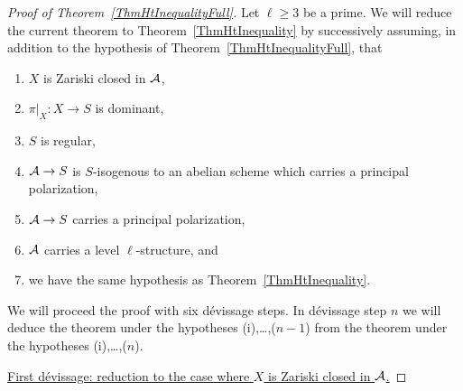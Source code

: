\begin{proof}[Proof of Theorem~\ref{ThmHtInequalityFull}]
  Let $\ell\ge 3$ be a prime.
  We will  reduce the current theorem to Theorem~\ref{ThmHtInequality}
  by successively assuming, in addition to the hypothesis of Theorem~\ref{ThmHtInequalityFull}, that
\begin{enumerate}
  \item[(i)] $X$ is Zariski closed in $\mathcal{A}$,
  \item[(ii)] $\pi|_X \colon X\rightarrow S$ is dominant,
  \item[(iii)] $S$ is regular, 
  \item[(iv)] $\mathcal{A} \rightarrow S$ is $S$-isogenous to an abelian scheme which carries a principal polarization,
  \item[(v)] $\mathcal{A} \rightarrow S$ carries a principal polarization,
  \item[(vi)] $\mathcal{A}$ carries a level $\ell$-structure, and
  \item[(vii)]  we have the same hypothesis as Theorem~\ref{ThmHtInequality}.%
%
\end{enumerate}
We will proceed the proof with six d\'{e}vissage steps.
In d\'evissage step $n$ we will deduce
the theorem under the hypotheses (i),\ldots,($n-1$) 
from the theorem under the hypotheses (i),\ldots,($n$). 


\ul{First d\'{e}vissage: reduction to the case where $X$ is Zariski
  closed in $\mathcal{A}$.}


\end{proof}
